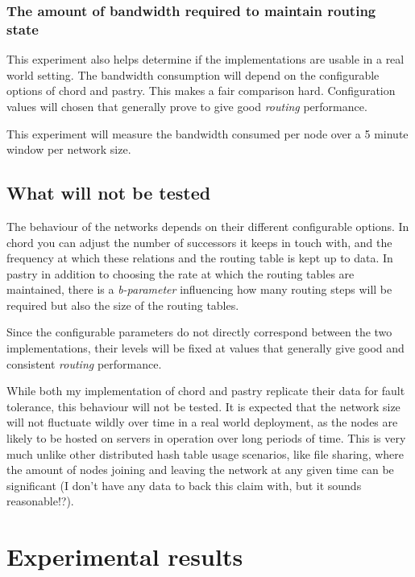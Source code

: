 \subsubsection{The amount of bandwidth required to maintain routing state}
This experiment also helps determine if the implementations are usable in a real world setting.
The bandwidth consumption will depend on the configurable options of chord and pastry. This makes a fair comparison hard. Configuration values will chosen that generally prove to give good \textit{routing} performance.

This experiment will measure the bandwidth consumed per node over a 5 minute window per network size.

\subsection{What will not be tested}
The behaviour of the networks depends on their different configurable options. 
In chord you can adjust the number of successors it keeps in touch with, and the frequency at which these relations and the routing table is kept up to data.
In pastry in addition to choosing the rate at which the routing tables are maintained, there is a \textit{b-parameter} influencing how many routing steps will be required but also the size of the routing tables.

Since the configurable parameters do not directly correspond between the two implementations, their levels will be fixed at values that generally give good and consistent \textit{routing} performance.

While both my implementation of chord and pastry replicate their data for fault tolerance, this behaviour will not be tested. It is expected that the network size will not fluctuate wildly over time in a real world deployment, as the nodes are likely to be hosted on servers in operation over long periods of time. This is very much unlike other distributed hash table usage scenarios, like file sharing, where the amount of nodes joining and leaving the network at any given time can be significant (I don't have any data to back this claim with, but it sounds reasonable!?).


\section{Experimental results}
